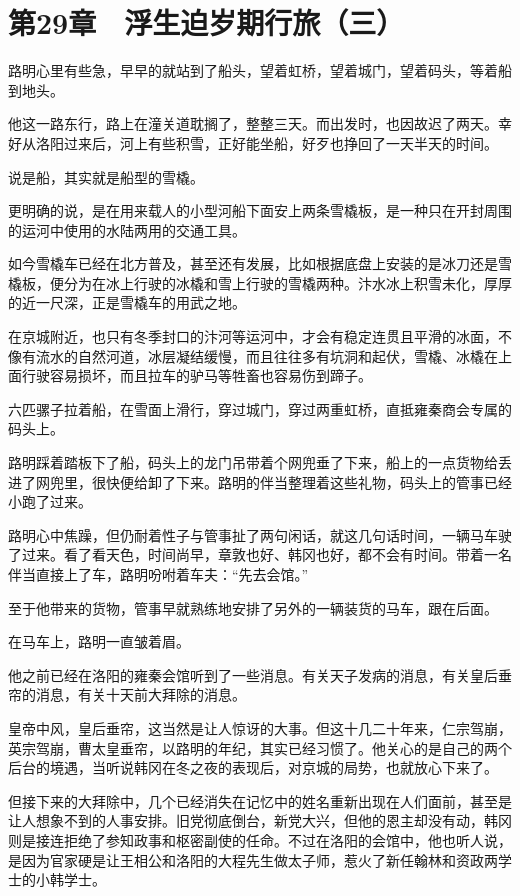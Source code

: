 \section{第29章　浮生迫岁期行旅（三）}

路明心里有些急，早早的就站到了船头，望着虹桥，望着城门，望着码头，等着船到地头。

他这一路东行，路上在潼关道耽搁了，整整三天。而出发时，也因故迟了两天。幸好从洛阳过来后，河上有些积雪，正好能坐船，好歹也挣回了一天半天的时间。 

说是船，其实就是船型的雪橇。 

更明确的说，是在用来载人的小型河船下面安上两条雪橇板，是一种只在开封周围的运河中使用的水陆两用的交通工具。 

如今雪橇车已经在北方普及，甚至还有发展，比如根据底盘上安装的是冰刀还是雪橇板，便分为在冰上行驶的冰橇和雪上行驶的雪橇两种。汴水冰上积雪未化，厚厚的近一尺深，正是雪橇车的用武之地。 

在京城附近，也只有冬季封口的汴河等运河中，才会有稳定连贯且平滑的冰面，不像有流水的自然河道，冰层凝结缓慢，而且往往多有坑洞和起伏，雪橇、冰橇在上面行驶容易损坏，而且拉车的驴马等牲畜也容易伤到蹄子。 

六匹骡子拉着船，在雪面上滑行，穿过城门，穿过两重虹桥，直抵雍秦商会专属的码头上。

路明踩着踏板下了船，码头上的龙门吊带着个网兜垂了下来，船上的一点货物给丢进了网兜里，很快便给卸了下来。路明的伴当整理着这些礼物，码头上的管事已经小跑了过来。 

路明心中焦躁，但仍耐着性子与管事扯了两句闲话，就这几句话时间，一辆马车驶了过来。看了看天色，时间尚早，章敦也好、韩冈也好，都不会有时间。带着一名伴当直接上了车，路明吩咐着车夫：“先去会馆。” 

至于他带来的货物，管事早就熟练地安排了另外的一辆装货的马车，跟在后面。 

在马车上，路明一直皱着眉。 

他之前已经在洛阳的雍秦会馆听到了一些消息。有关天子发病的消息，有关皇后垂帘的消息，有关十天前大拜除的消息。 

皇帝中风，皇后垂帘，这当然是让人惊讶的大事。但这十几二十年来，仁宗驾崩，英宗驾崩，曹太皇垂帘，以路明的年纪，其实已经习惯了。他关心的是自己的两个后台的境遇，当听说韩冈在冬之夜的表现后，对京城的局势，也就放心下来了。 

但接下来的大拜除中，几个已经消失在记忆中的姓名重新出现在人们面前，甚至是让人想象不到的人事安排。旧党彻底倒台，新党大兴，但他的恩主却没有动，韩冈则是接连拒绝了参知政事和枢密副使的任命。不过在洛阳的会馆中，他也听人说，是因为官家硬是让王相公和洛阳的大程先生做太子师，惹火了新任翰林和资政两学士的小韩学士。 

